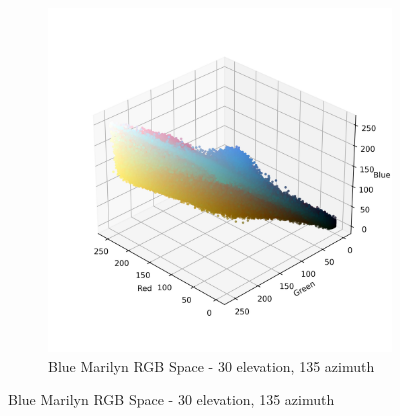 \documentclass{article}
\begin{document}
\begin{figure}[ht]
\begin{subfigure}{0.45\textwidth}
    \includegraphics[width=\textwidth]{main_files/figure-latex/4_14_blue_marilyn_original_scatter.jpg}
    \caption{Blue Marilyn RGB Space - 30 \degree elevation, 135 \degree azimuth}
    \label{fig:4_14_blue_marilyn_original_scatter}
  \end{subfigure}
  \label{fig:blue_marilyn_original_scatter_1}
\end{figure}
\end{document}
